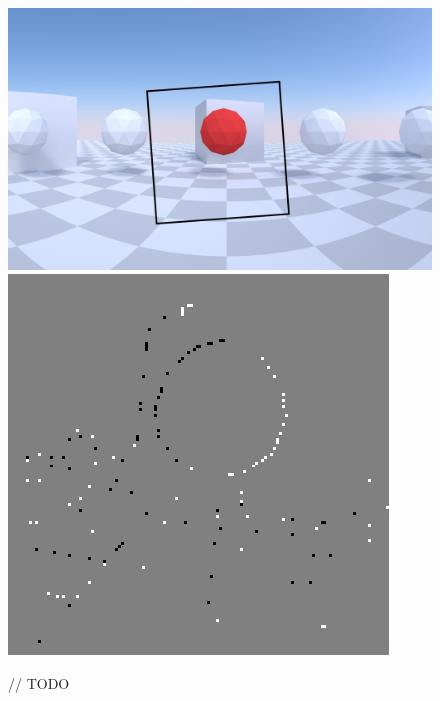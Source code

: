 \begin{figure}
\label{fig:simulation}
\includegraphics[width=\linewidth]{images/simulation_raw.jpg}
\includegraphics[width=\linewidth]{images/simulation_events.jpg}
\caption{// TODO}
\end{figure}

